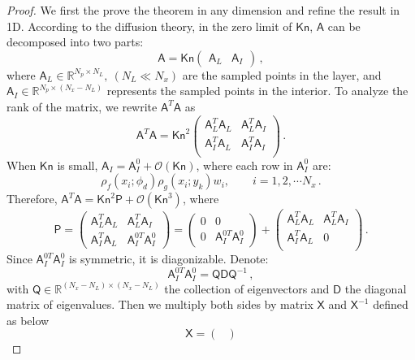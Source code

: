 \documentclass[english,reqno]{amsart}
\theoremstyle{plain}
\theoremstyle{definition} %
\newcommand{\Amat}{\mathsf{A}}
\newcommand{\Pmat}{\mathsf{P}}
\newcommand{\Dmat}{\mathsf{D}}
\newcommand{\Xmat}{\mathsf{X}}
\newcommand{\Qmat}{\mathsf{Q}}
\newcommand{\Kn}{\mathsf{Kn}}
\begin{document}
\begin{proof}
We first the prove the theorem in any dimension and refine the result in 1D. According to the diffusion theory, in the zero limit of $\Kn$, $\Amat$ can be decomposed into two parts:
\begin{equation} \label{eqn:A-decomp}
\Amat= \Kn \begin{pmatrix}
\Amat_L &\Amat_I
\end{pmatrix}\,,
\end{equation}
where $\Amat_L \in \mathbb{R}^{N_p \times N_L}, ~ (N_L \ll N_x)$ are the sampled points in the layer, and $\Amat_I\in \mathbb{R}^{N_p  \times (N_x-N_L)}$ represents the sampled points in the interior. To analyze the rank of the matrix, we rewrite $\Amat^T\Amat$ as
\[
\Amat^T\Amat= \Kn^2
\begin{pmatrix}
\Amat_L^T\Amat_L & \Amat^T_L\Amat_I \\
\Amat_I^T\Amat_L & \Amat^T_I\Amat_I \\
\end{pmatrix}\,.
 \] 
When $\Kn$ is small, $\Amat_I=\Amat^0_I+\mathcal{O}(\Kn)$, where each row in $\Amat_I^0$ are:
\begin{equation} \label{eqn:Aij}
  \rho_f(x_i; \phi_d)\rho_g(x_i; y_k) w_i, \qquad  i= 1, 2, \cdots N_x\,.
 \end{equation}
Therefore, $\Amat^T\Amat=\Kn^2 \Pmat+\mathcal{O}(\Kn^3)$, where
\[
\Pmat=
\begin{pmatrix}
\Amat_L^T\Amat_L & \Amat^T_L\Amat_I \\
\Amat_I^T\Amat_L & \Amat^{0T}_I\Amat^0_I 
\end{pmatrix}
=
\begin{pmatrix}
0 & 0\\
0& \Amat^{0T}_I\Amat_I^{0}
\end{pmatrix}
+
\begin{pmatrix}
\Amat_L^T\Amat_L & \Amat^T_L\Amat_I\\
\Amat_I^T\Amat_L & 0\\
\end{pmatrix}\,.
\]
Since $\Amat_I^{0T}\Amat_I^0$ is symmetric, it is diagonizable. Denote:
\begin{equation}
\Amat_I^{0T}\Amat_I^0 = \Qmat\Dmat\Qmat^{-1}\,,
\end{equation}
with $\Qmat\in \mathbb{R}^{(N_x-N_L)\times (N_x-N_L)}$ the collection of eigenvectors and $\Dmat$ the diagonal matrix of eigenvalues. Then we multiply both sides by matrix $\Xmat$ and $\Xmat^{-1}$ defined as below
\[
\Xmat=
\begin{pmatrix}

\end{pmatrix}\]
\end{proof}
\end{document}
